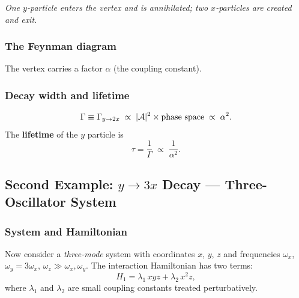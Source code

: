 \begin{center}
\emph{One $y$-particle enters the vertex and is annihilated; two $x$-particles are created and exit.}
\end{center}

\subsubsection*{The Feynman diagram}
\begin{center}
\end{center}

The vertex carries a factor $\alpha$ (the coupling constant).

\subsubsection*{Decay width and lifetime}
\begin{equation}
  \Gamma \equiv \Gamma_{y \to 2x}
  \;\propto\; |\mathcal{A}|^2 \times \text{phase space}
  \;\propto\; \alpha^2.
  \label{eq:lec04:decay-width}
\end{equation}
The \textbf{lifetime} of the $y$ particle is
\begin{equation}
  \tau = \frac{1}{\Gamma} \;\propto\; \frac{1}{\alpha^2}.
  \label{eq:lec04:lifetime}
\end{equation}

\subsection*{Second Example: $y \to 3x$ Decay — Three-Oscillator System}

\subsubsection*{System and Hamiltonian}
Now consider a \emph{three-mode} system with coordinates $x$, $y$, $z$ and frequencies $\omega_x$, $\omega_y = 3\omega_x$, $\omega_z \gg \omega_x, \omega_y$.  The interaction Hamiltonian has two terms:
\begin{equation}
  H_1 = \lambda_1\, xyz + \lambda_2\, x^2 z,
  \label{eq:lec04:H1-three}
\end{equation}
where $\lambda_1$ and $\lambda_2$ are small coupling constants treated perturbatively.


